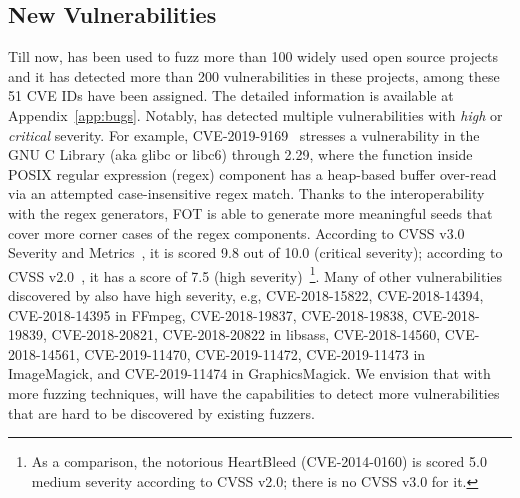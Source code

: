 \subsection{New Vulnerabilities}

Till now, {\FOT} has been used to fuzz more than 100 widely used open source projects and it has detected more than 200 vulnerabilities in these projects, among these 51 CVE IDs have been assigned. The detailed information is available at Appendix~\ref{app:bugs}. Notably, \FOT has detected multiple vulnerabilities with \emph{high} or \emph{critical} severity. For example, CVE-2019-9169~\cite{CVE-2019-9169} stresses a vulnerability in the GNU C Library (aka glibc or libc6) through 2.29, where the function  inside POSIX regular expression (regex) component has a heap-based buffer over-read via an attempted case-insensitive regex match. Thanks to the interoperability with the regex generators, FOT is able to generate more meaningful seeds that cover more corner cases of the regex components. According to CVSS v3.0 Severity and Metrics~\cite{cvss3}, it is scored 9.8 out of 10.0 (critical severity); according to CVSS v2.0~\cite{cvss2}, it has a score of 7.5 (high severity)~\footnote{As a comparison, the notorious HeartBleed (CVE-2014-0160) is scored 5.0 medium severity according to CVSS v2.0; there is no CVSS v3.0 for it.}. Many of other vulnerabilities discovered by \FOT also have high severity, e.g, CVE-2018-15822, CVE-2018-14394, CVE-2018-14395 in FFmpeg, CVE-2018-19837, CVE-2018-19838, CVE-2018-19839, CVE-2018-20821, CVE-2018-20822 in libsass, CVE-2018-14560, CVE-2018-14561, CVE-2019-11470, CVE-2019-11472, CVE-2019-11473 in ImageMagick, and CVE-2019-11474 in GraphicsMagick. We envision that with more fuzzing techniques, \FOT will have the capabilities to detect more vulnerabilities that are hard to be discovered by existing fuzzers.
